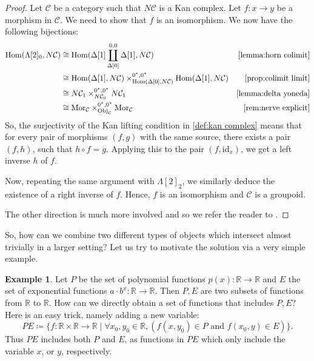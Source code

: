 \documentclass[11pt, a4paper]{amsart}
\newcommand{\cC}{\mathcal{C}}
\newcommand{\bR}{\mathbb{R}}
\newcommand{\Hom}{\mathrm{Hom}}
\newcommand{\Mor}{\mathrm{Mor}}
\newcommand{\id}{\mathrm{id}}
\newcommand{\Obj}{\mathrm{Obj}}
\theoremstyle{definition}
\newtheorem{example}[equation]{Example}
\theoremstyle{remark}
\numberwithin{equation}{section}
\begin{document}
\begin{proof}
  Let $\cC$ be a category such that $N\cC$ is a Kan complex. Let $f\colon x \to y$ be a morphism in $\cC$. We need to show that $f$ is an isomorphism. We now have the following bijections:
  \begin{align*}
    \Hom(\Lambda[2]_0, N\cC) & \cong \Hom(\Delta[1] \coprod^{0,0}_{\Delta[0]} \Delta[1],N\cC) & \text{\cref{lemma:horn colimit}}\\ 
    &  \cong \Hom(\Delta[1], N\cC) \times^{0^*,0^*}_{\Hom(\Delta[0], N\cC)} \Hom(\Delta[1], N\cC) & \text{\cref{prop:colimit limit}}\\ 
      & \cong N\cC_1 \times^{0^*,0^*}_{N\cC_0} N\cC_1 & \text{\cref{lemma:delta yoneda}}\\
      & \cong \Mor_\cC \times^{0^*,0^*}_{\Obj_\cC} \Mor_\cC & \text{\cref{rem:nerve explicit}} 
  \end{align*}
  So, the surjectivity of the Kan lifting condition in \cref{def:kan complex} means that for every pair of morphisms $(f,g)$ with the same source, there exists a pair $(f,h)$, such that $h\circ f = g$. Applying this to the pair $(f,\id_x)$, we get a left inverse $h$ of $f$. 

  Now, repeating the same argument with $\Lambda[2]_2$, we similarly deduce the existence of a right inverse of $f$. Hence, $f$ is an isomorphism and $\cC$ is a groupoid.

  The other direction is much more involved and so we refer the reader to \cite[\href{https://kerodon.net/tag/0037}{Proposition 0037}]{lurie2026kerodon}. 
\end{proof}  

So, how can we combine two different types of objects which intersect almost trivially in a larger setting? Let us try to motivate the solution via a very simple example.

\begin{example} \label{ex:combine functions}
  Let $P$ be the set of polynomial functions $p(x)\colon \bR \to \bR$ and $E$ the set of exponential functions $a \cdot b^x\colon \bR \to \bR$. Then $P, E$ are two subsets of functions from $\bR$ to $\bR$. How can we directly obtain a set of functions that includes $P,E$? Here is an easy trick, namely adding a new variable:
  \[ PE \coloneq \{ f\colon \bR \times \bR \to \bR \mid \forall x_0, y_0 \in \bR,  (f(x,y_0) \in P \text{ and } f(x_0,y) \in E)\}. \]
  Thus $PE$ includes both $P$ and $E$, as functions in $PE$ which only include the variable $x$, or $y$, respectively. 
\end{example}
\end{document}
